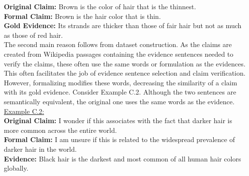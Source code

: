 \noindent\textbf{Original Claim:} Brown is the color of hair that is the thinnest.\\
\textbf{Formal Claim:} Brown is the hair color that is thin. \\
\textbf{Gold Evidence:} Its strands are thicker than those of fair hair but not as much as those of red hair. 
\vspace{0.2cm}\\
The second main reason follows from dataset construction. As the claims are created from Wikipedia passages containing the evidence sentences needed to verify the claims, these often use the same words or formulation as the evidences. This often facilitates the job of evidence sentence selection and claim verification. However, formalizing modifies these words, decreasing the similarity of a claim with its gold evidence. Consider Example C.2. Although the two sentences are semantically equivalent, the original one uses the same words as the evidence. 
\vspace{0.2cm}\\
\noindent\underline{\hypertarget{ex5}{Example C.2}:}
\vspace{0.2cm}\\
\noindent\textbf{Original Claim:} I wonder if this associates with the fact that darker hair is more common across the entire world. \\
\textbf{Formal Claim:} I am unsure if this is related to the widespread prevalence of darker hair in the world. \\
\textbf{Evidence:} Black hair is the darkest and most common of all human hair colors globally.
